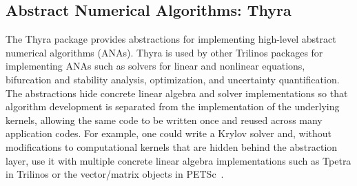\subsection{Abstract Numerical Algorithms: Thyra}
The Thyra package provides abstractions for implementing high-level abstract numerical algorithms (ANAs). Thyra is used by other Trilinos packages for implementing ANAs such as solvers for linear and nonlinear equations, bifurcation and stability analysis, optimization, and uncertainty quantification. The abstractions hide concrete linear algebra and solver implementations so that algorithm development is separated from the implementation of the underlying kernels, allowing the same code to be written once and reused across many application codes. For example, one could write a Krylov solver and, without modifications to computational kernels that are hidden behind the abstraction layer, use it with multiple concrete linear algebra implementations such as Tpetra in Trilinos or the vector/matrix objects in PETSc~\cite{petsc-web-page}.

